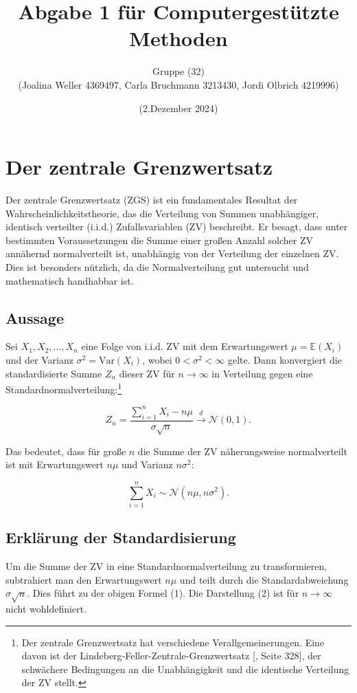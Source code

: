 \documentclass[12pt,a4paper]{article}
\title{Abgabe 1 für Computergestützte Methoden}
\author{Gruppe (32)\\(Joalina Weller 4369497, Carla Bruchmann 3213430, Jordi Olbrich 4219996)}
\date{(2.Dezember 2024)}
\begin{document}
\maketitle

\tableofcontents

\newpage

\section{Der zentrale Grenzwertsatz}

Der zentrale Grenzwertsatz (ZGS) ist ein fundamentales Resultat der Wahrscheinlichkeitstheorie, das die Verteilung von Summen unabhängiger, identisch verteilter (i.i.d.) Zufallsvariablen (ZV) beschreibt. Er besagt, dass unter bestimmten Voraussetzungen die Summe einer großen Anzahl solcher ZV annähernd normalverteilt ist, unabhängig von der Verteilung der einzelnen ZV. Dies ist besonders nützlich, da die Normalverteilung gut untersucht und mathematisch handhabbar ist.

\subsection{Aussage}

Sei \(X_1, X_2, \dots, X_n\) eine Folge von i.i.d. ZV mit dem Erwartungswert \(\mu = \mathbb{E}(X_i)\) und der Varianz \(\sigma^2 = \text{Var}(X_i)\), wobei \(0 < \sigma^2 < \infty\) gelte. Dann konvergiert die standardisierte Summe \(Z_n\) dieser ZV für \(n \to \infty\) in Verteilung gegen eine Standardnormalverteilung:\footnote{Der zentrale Grenzwertsatz hat verschiedene Verallgemeinerungen. Eine davon ist der Lindeberg-Feller-Zentrale-Grenzwertsatz [\cite{Klenke2013}, Seite 328], der schwächere Bedingungen an die Unabhängigkeit und die identische Verteilung der ZV stellt.}

\[
Z_n = \frac{\sum_{i=1}^n X_i - n\mu}{\sigma \sqrt{n}} \overset{d}{\to} \mathcal{N}(0,1).
\]

Das bedeutet, dass für große \(n\) die Summe der ZV näherungsweise normalverteilt ist mit Erwartungswert \(n\mu\) und Varianz \(n\sigma^2\):

\[
\sum_{i=1}^n X_i \sim \mathcal{N}(n\mu, n\sigma^2).
\]

\subsection{Erklärung der Standardisierung}

Um die Summe der ZV in eine Standardnormalverteilung zu transformieren, subtrahiert man den Erwartungswert \(n\mu\) und teilt durch die Standardabweichung \(\sigma \sqrt{n}\). Dies führt zu der obigen Formel (1). Die Darstellung (2) ist für \(n \to \infty\) nicht wohldefiniert.
\end{document}
